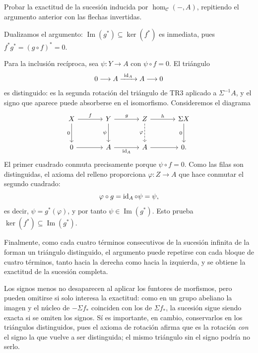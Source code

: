 \begin{ejer}
Probar la exactitud de la sucesión inducida por $\hom_{\mathcal C}(-,A)$, repitiendo el argumento anterior con las flechas invertidas.
\end{ejer}

\begin{sol}
Dualizamos el argumento: $\operatorname{Im}(g^*)\subseteq\ker(f^*)$ es inmediata, pues $f^*g^*=(g\circ f)^*=0$.

Para la inclusión recíproca, sea $\psi\colon Y\to A$ con $\psi\circ f=0$. El triángulo
\[
0\longrightarrow A\xrightarrow{\ \operatorname{id}_A\ }A\longrightarrow 0
\]
es distinguido: es la segunda rotación del triángulo de \textup{TR3} aplicado a $\Sigma^{-1}A$, y el signo que aparece puede absorberse en el isomorfismo. Consideremos el diagrama
\[
\begin{tikzcd}[column sep=large, row sep=large]
X \arrow[r,"f"] \arrow[d,"0"'] & Y \arrow[r,"g"] \arrow[d,"\psi"'] & Z \arrow[r,"h"] \arrow[d,dashed,"\varphi"'] & \Sigma X \arrow[d,"0"']\\
0 \arrow[r] & A \arrow[r,"\id_A"'] & A \arrow[r] & 0 .
\end{tikzcd}
\]
El primer cuadrado conmuta precisamente porque $\psi\circ f=0$. Como las filas son distinguidas, el axioma del relleno proporciona $\varphi\colon Z\to A$ que hace conmutar el segundo cuadrado:
\[
\varphi\circ g=\operatorname{id}_A\circ\psi=\psi,
\]
es decir, $\psi=g^*(\varphi)$, y por tanto $\psi\in\operatorname{Im}(g^*)$. Esto prueba $\ker(f^*)\subseteq\operatorname{Im}(g^*)$.

Finalmente, como cada cuatro términos consecutivos de la sucesión infinita de la  forman un triángulo distinguido, el argumento puede repetirse con cada bloque de cuatro términos, tanto hacia la derecha como hacia la izquierda, y se obtiene la exactitud de la sucesión completa.
\end{sol}

\begin{nota}
   Los signos menos no desaparecen al aplicar los funtores de morfismos, pero pueden omitirse si solo interesa la exactitud: como en un grupo abeliano la imagen y el núcleo de $-\Sigma f_*$ coinciden con los de $\Sigma f_*$, la sucesión sigue siendo exacta si se omiten los signos. Sí es importante, en cambio, conservarlos en los triángulos distinguidos, pues el axioma de rotación afirma que es la rotación \emph{con} el signo la que vuelve a ser distinguida; el mismo triángulo sin el signo podría no serlo.
\end{nota}

